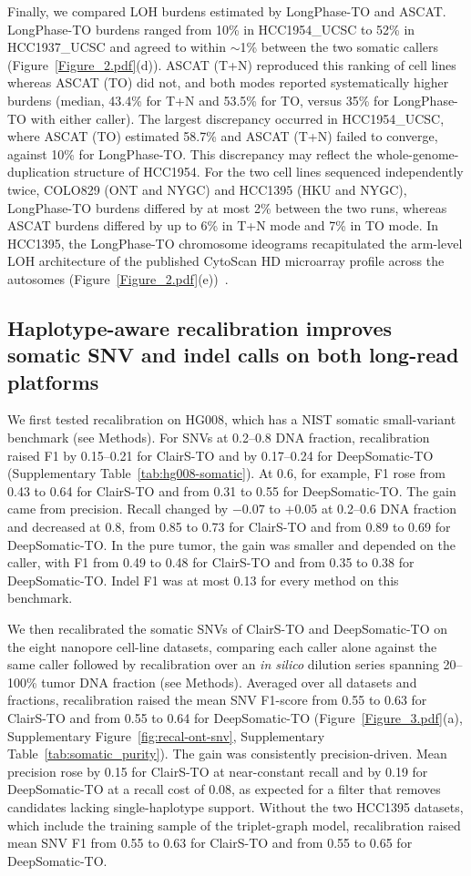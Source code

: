\documentclass[unnumsec,webpdf,contemporary,large]{oup-authoring-template}
\begin{document}
Finally, we compared LOH burdens estimated by LongPhase-TO and ASCAT. LongPhase-TO burdens ranged from 10\% in HCC1954\_UCSC to 52\% in HCC1937\_UCSC and agreed to within $\sim$1\% between the two somatic callers (Figure~\ref{Figure_2.pdf}(d)). ASCAT (T+N) reproduced this ranking of cell lines whereas ASCAT (TO) did not, and both modes reported systematically higher burdens (median, 43.4\% for T+N and 53.5\% for TO, versus 35\% for LongPhase-TO with either caller). The largest discrepancy occurred in HCC1954\_UCSC, where ASCAT (TO) estimated 58.7\% and ASCAT (T+N) failed to converge, against 10\% for LongPhase-TO. This discrepancy may reflect the whole-genome-duplication structure of HCC1954. For the two cell lines sequenced independently twice, COLO829 (ONT and NYGC) and HCC1395 (HKU and NYGC), LongPhase-TO burdens differed by at most 2\% between the two runs, whereas ASCAT burdens differed by up to 6\% in T+N mode and 7\% in TO mode. In HCC1395, the LongPhase-TO chromosome ideograms recapitulated the arm-level LOH architecture of the published CytoScan HD microarray profile across the autosomes (Figure~\ref{Figure_2.pdf}(e))~\cite{fang2021}.

\subsection{Haplotype-aware recalibration improves somatic SNV and indel calls on both long-read platforms}
We first tested recalibration on HG008, which has a NIST somatic small-variant benchmark (see Methods). For SNVs at 0.2--0.8 DNA fraction, recalibration raised F1 by 0.15--0.21 for ClairS-TO and by 0.17--0.24 for DeepSomatic-TO (Supplementary Table~\ref{tab:hg008-somatic}). At 0.6, for example, F1 rose from 0.43 to 0.64 for ClairS-TO and from 0.31 to 0.55 for DeepSomatic-TO. The gain came from precision. Recall changed by $-0.07$ to $+0.05$ at 0.2--0.6 DNA fraction and decreased at 0.8, from 0.85 to 0.73 for ClairS-TO and from 0.89 to 0.69 for DeepSomatic-TO. In the pure tumor, the gain was smaller and depended on the caller, with F1 from 0.49 to 0.48 for ClairS-TO and from 0.35 to 0.38 for DeepSomatic-TO. Indel F1 was at most 0.13 for every method on this benchmark.

We then recalibrated the somatic SNVs of ClairS-TO and DeepSomatic-TO on the eight nanopore cell-line datasets, comparing each caller alone against the same caller followed by recalibration over an \emph{in silico} dilution series spanning 20--100\% tumor DNA fraction (see Methods). Averaged over all datasets and fractions, recalibration raised the mean SNV F1-score from 0.55 to 0.63 for ClairS-TO and from 0.55 to 0.64 for DeepSomatic-TO (Figure~\ref{Figure_3.pdf}(a), Supplementary Figure~\ref{fig:recal-ont-snv}, Supplementary Table~\ref{tab:somatic_purity}). The gain was consistently precision-driven. Mean precision rose by 0.15 for ClairS-TO at near-constant recall and by 0.19 for DeepSomatic-TO at a recall cost of 0.08, as expected for a filter that removes candidates lacking single-haplotype support. Without the two HCC1395 datasets, which include the training sample of the triplet-graph model, recalibration raised mean SNV F1 from 0.55 to 0.63 for ClairS-TO and from 0.55 to 0.65 for DeepSomatic-TO.
\end{document}
